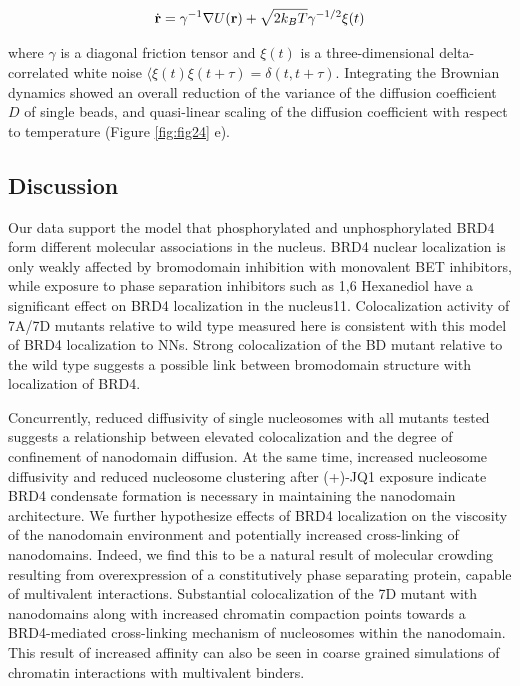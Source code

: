 \begin{equation}
\dot{\bold{r}} = \gamma^{-1}\nabla U(\bold{r}) +\sqrt{2 k_{B}T}\gamma^{-1/2}\xi(t)
\end{equation}

where $\gamma$ is a diagonal friction tensor and $\xi(t)$ is a three-dimensional delta-correlated white noise $\langle \xi(t)\xi(t+\tau)  = \delta(t,t+\tau)$. Integrating the Brownian dynamics showed an overall reduction of the variance of the diffusion coefficient $D$ of single beads, and quasi-linear scaling of the diffusion coefficient with respect to temperature (Figure \ref{fig:fig24} e).

\subsection{Discussion}

Our data support the model that phosphorylated and unphosphorylated BRD4 form different molecular associations in the nucleus. BRD4 nuclear localization is only weakly affected by bromodomain inhibition with monovalent BET inhibitors, while exposure to phase separation inhibitors such as 1,6 Hexanediol have a significant effect on BRD4 localization in the nucleus11. Colocalization activity of 7A/7D mutants relative to wild type measured here is consistent with this model of BRD4 localization to NNs. Strong colocalization of the BD mutant relative to the wild type suggests a possible link between bromodomain structure with localization of BRD4. 

Concurrently, reduced diffusivity of single nucleosomes with all mutants tested suggests a relationship between elevated colocalization and the degree of confinement of nanodomain diffusion. At the same time, increased nucleosome diffusivity and reduced nucleosome clustering after (+)-JQ1 exposure indicate BRD4 condensate formation is necessary in maintaining the nanodomain architecture. We further hypothesize effects of BRD4 localization on the viscosity of the nanodomain environment and potentially increased cross-linking of nanodomains. Indeed, we find this to be a natural result of molecular crowding resulting from overexpression of a constitutively phase separating protein, capable of multivalent interactions. Substantial colocalization of the 7D mutant with nanodomains along with increased chromatin compaction points towards a BRD4-mediated cross-linking mechanism of nucleosomes within the nanodomain. This result of increased affinity can also be seen in coarse grained simulations of chromatin interactions with multivalent binders.
 
